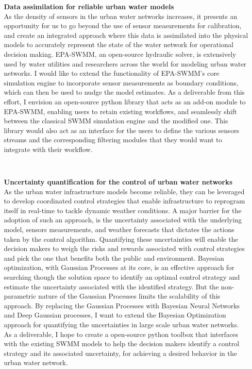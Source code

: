 \noindent \textbf{Data assimilation for reliable urban water models}\\
As the density of sensors in the urban water networks increases, it presents an opportunity for us to go beyond the use of sensor measurements for calibration, and create an integrated approach where this data is assimilated into the physical models to accurately represent the state of the water network for operational decision making.
EPA-SWMM, an open-source hydraulic solver, is extensively used by water utilities and researchers across the world for modeling urban water networks. 
I would like to extend the functionality of EPA-SWMM's core simulation engine to incorporate sensor measurements as boundary conditions, which can then be used to nudge the model estimates.
As a deliverable from this effort, I envision an open-source python library that acts as an add-on module to EPA-SWMM, enabling users to retain existing workflows, and seamlessly shift between the classical SWMM simulation engine and the modified one. 
This library would also act as an interface for the users to define the various sensors streams and the corresponding filtering modules that they would want to integrate with their workflow.

\

\noindent \textbf{Uncertainty quantification for the control of urban water networks}\\
As the urban water infrastructure models become reliable, they can be leveraged to develop coordinated control strategies that enable infrastructure to reprogram itself in real-time to tackle dynamic weather conditions.
A major barrier for the adoption of such an approach, is the uncertainty associated with the underlying model, sensors measurements, and weather forecasts that dictates the actions taken by the control algorithm.
Quantifying these uncertainties will enable the decision makers to weigh the risks and rewards associated with control strategies and pick the one that benefits both the public and environment.
Bayesian optimization, with Gaussian Processes at its core, is an effective approach for searching though the solution space to identify an optimal control strategy and estimate the uncertainty associated with the identified strategy.
But the non-parametric nature of the Gaussian Processes limits the scalability of this approach.
By replacing the Gaussian Processes with Bayesian Neural Networks and Deep Gaussian processes, I want to extend the Bayesian Optimization approach for quantifying the uncertainties in large scale urban water networks. 
As a deliverable, I hope to create a open-source python toolbox that interfaces with the existing SWMM models to help the decision makers identify a control strategy and its associated uncertainty, for achieving a desired behavior in the urban water network.

